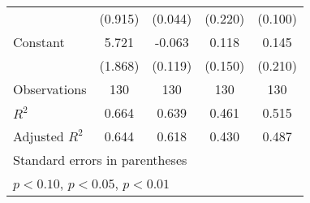 \begin{table}[htbp]
\begin{tabular}{l*{4}{c}}
                    &     (0.915)         &     (0.044)         &     (0.220)         &     (0.100)         \\
[1em]
Constant            &       5.721\sym{***}&      -0.063         &       0.118         &       0.145         \\
                    &     (1.868)         &     (0.119)         &     (0.150)         &     (0.210)         \\
\hline
Observations        &         130         &         130         &         130         &         130         \\
\(R^{2}\)           &       0.664         &       0.639         &       0.461         &       0.515         \\
Adjusted \(R^{2}\)  &       0.644         &       0.618         &       0.430         &       0.487         \\
\hline\hline
\multicolumn{5}{l}{\footnotesize Standard errors in parentheses}\\
\multicolumn{5}{l}{\footnotesize \sym{*} \(p<0.10\), \sym{**} \(p<0.05\), \sym{***} \(p<0.01\)}\\
\end{tabular}
\end{table}
